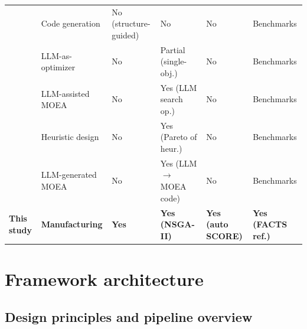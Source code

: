 \documentclass[a4paper,fleqn]{cas-sc}
\begin{document}
\begin{table}[ ]
{\begin{tabular}{p{2.6cm} p{2.0cm} p{1.8cm} p{2.0cm} p{2.2cm} p{2.6cm}}
  \addlinespace                                                                                                         
  \citet{Wan2026struct} & Code generation & No (structure-guided) & No & No & Benchmarks \\ \addlinespace 
  \citet{Yang2024opro} & LLM-as-optimizer & No & Partial (single-obj.) & No & Benchmarks \\ \addlinespace   
  \citet{Liu2024llm4moea} & LLM-assisted MOEA & No & Yes (LLM search op.) & No & Benchmarks \\ \addlinespace 
  \citet{Yao2025meoh} & Heuristic design & No & Yes (Pareto of heur.) & No & Benchmarks \\ \addlinespace     
  \citet{Huang2025tevc} & LLM-generated MOEA & No & Yes (LLM $\rightarrow$ MOEA code) & No & Benchmarks \\ 
  \addlinespace                                                                                                         
  \textbf{This study} & \textbf{Manufacturing} & \textbf{Yes} & \textbf{Yes (NSGA-II)} & \textbf{Yes (auto SCORE)} &    
  \textbf{Yes (FACTS ref.)} \\                                                                                          
  \bottomrule                                                                                                           
  \end{tabular}                                                                                                         
  }                                                                                                                     
  \end{table}      

  \section{Framework architecture}\label{sec:framework}                                                                 
                                                                                                                        
  \subsection{Design principles and pipeline overview}\label{sec:framework-overview}                                    
                                                                                                                        
\end{document}
